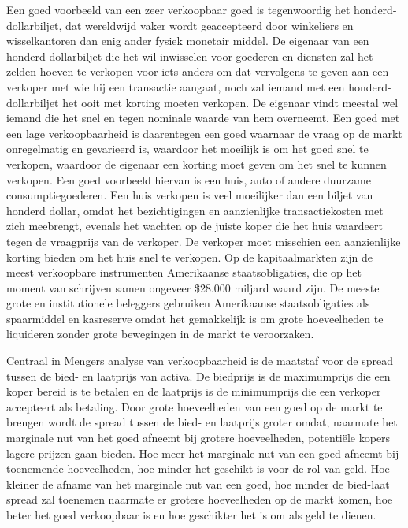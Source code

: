 Een goed voorbeeld van een zeer verkoopbaar goed is tegenwoordig het honderd-dollarbiljet, dat wereldwijd vaker wordt geaccepteerd door winkeliers en wisselkantoren dan enig ander fysiek monetair middel. De eigenaar van een honderd-dollarbiljet die het wil inwisselen voor goederen en diensten zal het zelden hoeven te verkopen voor iets anders om dat vervolgens te geven aan een verkoper met wie hij een transactie aangaat, noch zal iemand met een honderd-dollarbiljet het ooit met korting moeten verkopen. De eigenaar vindt meestal wel iemand die het snel en tegen nominale waarde van hem overneemt. Een goed met een lage verkoopbaarheid is daarentegen een goed waarnaar de vraag op de markt onregelmatig en gevarieerd is, waardoor het moeilijk is om het goed snel te verkopen, waardoor de eigenaar een korting moet geven om het snel te kunnen verkopen. Een goed voorbeeld hiervan is een huis, auto of andere duurzame consumptiegoederen. Een huis verkopen is veel moeilijker dan een biljet van honderd dollar, omdat het bezichtigingen en aanzienlijke transactiekosten met zich meebrengt, evenals het wachten op de juiste koper die het huis waardeert tegen de vraagprijs van de verkoper. De verkoper moet misschien een aanzienlijke korting bieden om het huis snel te verkopen. Op de kapitaalmarkten zijn de meest verkoopbare instrumenten Amerikaanse staatsobligaties, die op het moment van schrijven samen ongeveer \$28.000 miljard waard zijn. De meeste grote en institutionele beleggers gebruiken Amerikaanse staatsobligaties als spaarmiddel en kasreserve omdat het gemakkelijk is om grote hoeveelheden te liquideren zonder grote bewegingen in de markt te veroorzaken.

Centraal in Mengers analyse van verkoopbaarheid is de maatstaf voor de spread tussen de bied- en laatprijs van activa. De biedprijs is de maximumprijs die een koper bereid is te betalen en de laatprijs is de minimumprijs die een verkoper accepteert als betaling. Door grote hoeveelheden van een goed op de markt te brengen wordt de spread tussen de bied- en laatprijs groter omdat, naarmate het marginale nut van het goed afneemt bij grotere hoeveelheden, potentiële kopers lagere prijzen gaan bieden. Hoe meer het marginale nut van een goed afneemt bij toenemende hoeveelheden, hoe minder het geschikt is voor de rol van geld. Hoe kleiner de afname van het marginale nut van een goed, hoe minder de bied-laat spread zal toenemen naarmate er grotere hoeveelheden op de markt komen, hoe beter het goed verkoopbaar is en hoe geschikter het is om als geld te dienen.

